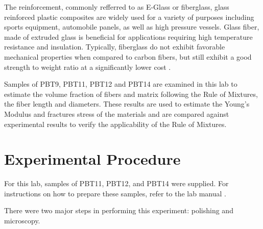 \documentclass[11pt]{article}
\begin{document}
The reinforcement, commonly refferred to as E-Glass or fiberglass, glass reinforced plastic composites are widely used for a variety of purposes including sports equipment, automobile panels, as well as high pressure vessels. Glass fiber, made of extruded glass is beneficial for applications requiring high temperature resistance and insulation. Typically, fiberglass do not exhibit favorable mechanical properties when compared to carbon fibers, but still exhibit a good strength to weight ratio at a significantly lower cost \cite{eglass}.

Samples of PBT9, PBT11, PBT12 and PBT14 are examined in this lab to estimate the volume fraction of fibers and matrix following the Rule of Mixtures, the fiber length and diameters. These results are used to estimate the Young's Modulus and fractures stress of the materials and are compared against experimental results to verify the applicability of the Rule of Mixtures.

\section{Experimental Procedure \cite{manual}}
For this lab, samples of PBT11, PBT12, and PBT14 were supplied. For instructions on how to prepare these samples, refer to the lab manual \cite{manual}.

There were two major steps in performing this experiment: polishing and microscopy.
\end{document}
